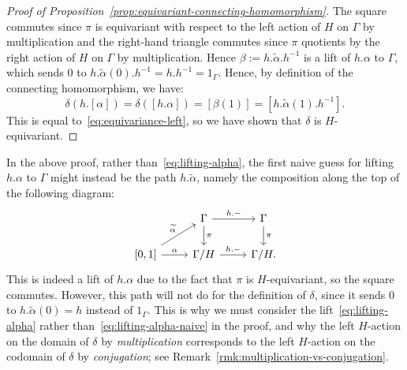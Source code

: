 \documentclass[AHL,Unicode,published]{cedram}
\begin{document}
\begin{proof}[Proof of Proposition~\ref{prop:equivariant-connecting-homomorphism}]
The square commutes since $\pi$ is equivariant with respect to the left action of $H$ on $\Gamma$ by multiplication and the right-hand triangle commutes since $\pi$ quotients by the right action of $H$ on $\Gamma$ by multiplication. Hence $\beta := h.\widetilde{\alpha}.h^{-1}$ is a lift of $h.\alpha$ to $\Gamma$, which sends $0$ to $h.\widetilde{\alpha}(0).h^{-1} = h.h^{-1} = 1_\Gamma$. Hence, by definition of the connecting homomorphism, we have:
\begin{equation}\label{eq:equivariance-right}
\delta(h.[\alpha]) = \delta([h.\alpha]) = [\beta(1)] = \left[h.\widetilde{\alpha}(1).h^{-1}\right].
\end{equation}
This is equal to~\eqref{eq:equivariance-left}, so we have shown that $\delta$ is $H$-equivariant.
\end{proof}

\begin{rema}\label{rmk:why-conjugation}
In the above proof, rather than~\eqref{eq:lifting-alpha}, the first naive guess for lifting $h.\alpha$ to $\Gamma$ might instead be the path $h.\widetilde{\alpha}$, namely the composition along the top of the following diagram:
\begin{equation}\label{eq:lifting-alpha-naive}
\begin{tikzcd}
& \Gamma \ar[r,"h.-"] \ar[d,"\pi"] & \Gamma \ar[d,"\pi"] \\
{[0,1]} \ar[r,"\alpha"] \ar[ur,"\widetilde{\alpha}"] & \Gamma/H \ar[r,"h.-"] & \Gamma/H.
\end{tikzcd}
\end{equation}
This is indeed a lift of $h.\alpha$ due to the fact that $\pi$ is $H$-equivariant, so the square commutes. However, this path will not do for the definition of $\delta$, since it sends $0$ to $h.\widetilde{\alpha}(0) = h$ instead of $1_\Gamma$. This is why we must consider the lift~\eqref{eq:lifting-alpha} rather than~\eqref{eq:lifting-alpha-naive} in the proof, and why the left $H$-action on the domain of $\delta$ by \emph{multiplication} corresponds to the left $H$-action on the codomain of $\delta$ by \emph{conjugation}; see Remark~\ref{rmk:multiplication-vs-conjugation}.
\end{rema}
\end{document}

